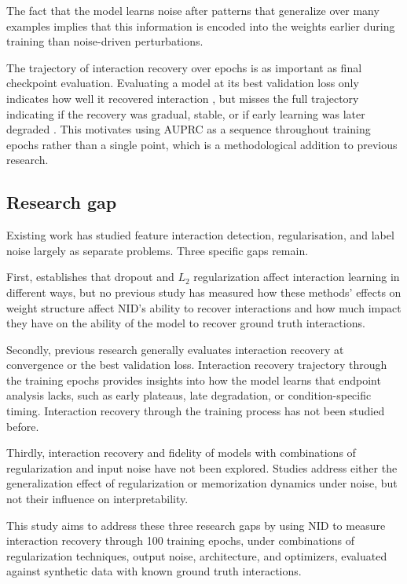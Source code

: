 \documentclass{article}
\begin{document}
The fact that the model learns noise after patterns that generalize over many examples implies that this information is encoded into the weights earlier during training than noise-driven perturbations.

The trajectory of interaction recovery over epochs is as important as final checkpoint evaluation. Evaluating a model at its best validation loss only indicates how well it recovered interaction \citep{apicella2026dontstopnowrethinking}, but misses the full trajectory indicating if the recovery was gradual, stable, or if early learning was later degraded \citep{toneva2019empiricalstudyexampleforgetting}. This motivates using AUPRC as a sequence throughout training epochs rather than a single point, which is a methodological addition to previous research.

\subsection{Research gap}

Existing work has studied feature interaction detection, regularisation, and label noise largely as separate problems. Three specific gaps remain.

First, \cite{lengerich2021dropoutregularizerinteractioneffects} establishes that dropout and \(L_2\) regularization affect interaction learning in different ways, but no previous study has measured how these methods' effects on weight structure affect NID's ability to recover interactions and how much impact they have on the ability of the model to recover ground truth interactions.

Secondly, previous research generally evaluates interaction recovery at convergence or the best validation loss. Interaction recovery trajectory through the training epochs provides insights into how the model learns that endpoint analysis lacks, such as early plateaus, late degradation, or condition-specific timing. Interaction recovery through the training process has not been studied before.

Thirdly, interaction recovery and fidelity of models with combinations of regularization and input noise have not been explored. Studies address either the generalization effect of regularization or memorization dynamics under noise, but not their influence on interpretability.

This study aims to address these three research gaps by using NID to measure interaction recovery through 100 training epochs, under combinations of regularization techniques, output noise, architecture, and optimizers, evaluated against synthetic data with known ground truth interactions.
\end{document}
